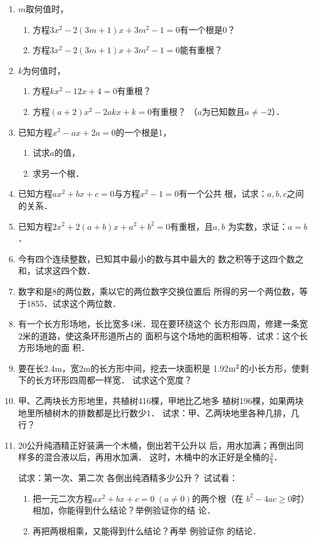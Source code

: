 \begin{enumerate}
\item $m$取何值时，
\begin{enumerate}
    \item 方程$3x^2-2(3m+1)x+3m^2-1=0$有一个根是0？
    \item 方程$3x^2-2(3m+1)x+3m^2-1=0$能有重根？
\end{enumerate}

\item $k$为何值时，
\begin{enumerate}
    \item 方程$kx^2-12x+4=0$有重根？
    \item 方程$(a+2)x^2-2akx+k=0$有重根？
（$a$为已知数且$a\ne-2$）．
\end{enumerate}

\item 已知方程$x^2-ax+2a=0$的一个根是1，
\begin{enumerate}
    \item 试求$a$的值，
    \item 求另一个根．
\end{enumerate}

\item 已知方程$ax^2+bx+c=0$与方程$x^2-1=0$有一个公共
根，试求：$a,b,c$之间的关系．
\item 已知方程$2x^2+2(a+b)x+a^2+b^2=0$有重根，且$a,b$
为实数，求证：$a=b$．
\item 今有四个连续整数，已知其中最小的数与其中最大的
数之积等于这四个数之和，试求这四个数．
\item 数字和是8的两位数，乘以它的两位数字交换位置后
所得的另一个两位数，等于1855．试求这个两位数．
\item 有一个长方形场地，长比宽多4米．现在要环绕这个
长方形四周，修建一条宽2米的道路，使这条环形道所占的
面积与这个场地的面积相等．试求：这个长方形场地的面
积．
\item 要在长2.4m，宽2m的长方形中间，挖去一块面积是
1.92${\rm m^2}$的小长方形，使剩下的长方环形四周都一样宽．
试求这个宽度？
\item 甲、乙两块长方形地里，共植树416棵，甲地比乙地多
植树196棵，如果两块地里所植树木的排数都是比行数少1．
试求：甲、乙两块地里各种几排，几行？
\item 20公升纯酒精正好装满一个木桶，倒出若干公升以
后，用水加满；再倒出同样多的混合液以后，再用水加满．
这时，木桶中的水正好是全桶的$\frac{3}{4}$．

试求：第一次、第二次
各倒出纯酒精多少公升？
\staritem 试试看：
\begin{enumerate}
    \item 把一元二次方程$ax^2+bx+c=0\; (a\ne 0)$的两个根（在
    $b^2-4ac\ge 0$时）相加，你能得到什么结论？举例验证你的结
论．
\item 再把两根相乘，又能得到什么结论？再举 例验证你
    的结论．
\end{enumerate}


\end{enumerate}

